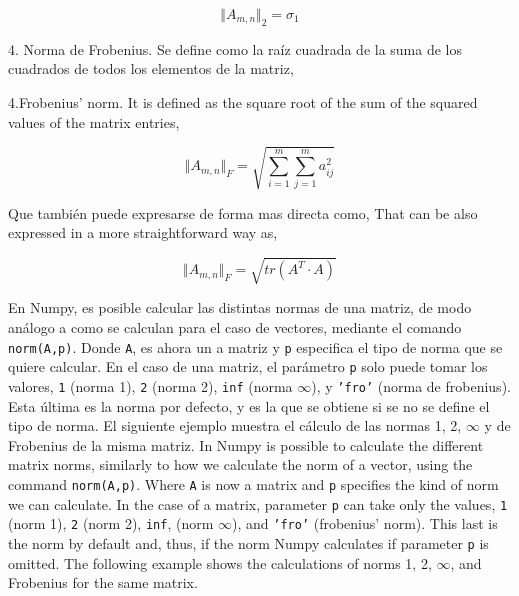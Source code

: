\begin{equation*}
\Vert A_{m,n} \Vert _2 = \sigma_{1}
\end{equation*}
\begin{paracol}{2}
4. Norma de Frobenius. Se define como la raíz cuadrada de la suma de los cuadrados de todos los elementos de la matriz,

\switchcolumn
4.Frobenius' norm. It is defined as the square root of the sum of the squared values of the matrix entries, 
\end{paracol}
\begin{equation*}
\Vert A_{m,n} \Vert _F =\sqrt{\sum_{i=1}^m \sum_{j=1}^m a_{ij}^2}
\end{equation*}
\begin{paracol}{2}
Que también puede expresarse de forma mas directa como,
\switchcolumn
That can be also expressed in a more straightforward way as,
\end{paracol}
\begin{equation*}
\Vert A_{m,n} \Vert _F =\sqrt{tr(A^T\cdot A)}
\end{equation*}
\begin{paracol}{2}
En Numpy, es posible calcular las distintas normas de una matriz, de modo análogo a como se calculan para el caso de vectores,  mediante el comando \texttt{norm(A,p)}. Donde \texttt{A}, es ahora un a matriz y \texttt{p} especifica el tipo de norma que se quiere calcular. En el caso de una matriz, el parámetro \texttt{p} solo puede tomar los valores, \texttt{1} (norma 1), \texttt{2} (norma 2), \texttt{inf} (norma $\infty$), y \texttt{'fro'} (norma de frobenius). Esta última es la norma por defecto, y es la que se obtiene si se no se define el tipo de norma. El siguiente ejemplo muestra el cálculo de las normas 1, 2, $\infty$ y de Frobenius de la misma matriz.
\switchcolumn
In Numpy is possible to calculate the different matrix norms, similarly to how we calculate the norm of a vector, using the command \texttt{norm(A,p)}. Where \texttt{A} is now a matrix and \texttt{p} specifies the kind of norm we can calculate. In the case of a matrix, parameter \texttt{p} can take only the values, \texttt{1} (norm 1), \texttt{2} (norm 2), \texttt{inf}, (norm $\infty$), and \texttt{'fro'} (frobenius' norm). This last is the norm by default and, thus, if the norm Numpy calculates if parameter \texttt{p} is omitted. The following example shows the calculations of norms 1, 2, $\infty$, and Frobenius for the same matrix.  
\end{paracol}
